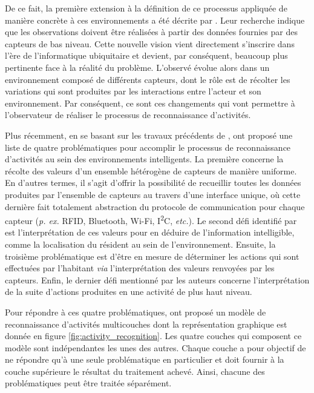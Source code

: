 {{De ce fait, la première extension à la définition de ce processus appliquée de manière concrète à ces environnements a été décrite par \cite{Patterson2005}. Leur recherche indique que les observations doivent être réalisées à partir des données fournies par des capteurs de bas niveau. Cette nouvelle vision vient directement s'inscrire dans l'ère de l'informatique ubiquitaire \citep{Weiser1991} et devient, par conséquent, beaucoup plus pertinente face à la réalité du problème. L'observé évolue alors dans un environnement composé de différents capteurs, dont le rôle est de récolter les variations qui sont produites par les interactions entre l'acteur et son environnement. Par conséquent, ce sont ces changements qui vont permettre à l'observateur de réaliser le processus de reconnaissance d'activités.

Plus récemment, en se basant sur les travaux précédents de \cite{Patterson2005}, \cite{Roy2013} ont proposé une liste de quatre problématiques pour accomplir le processus de reconnaissance d'activités au sein des environnements intelligents. La première concerne la récolte des valeurs d'un ensemble hétérogène de capteurs de manière uniforme. En d'autres termes, il s'agit d'offrir la possibilité de recueillir toutes les données produites par l'ensemble de capteurs au travers d'une interface unique, où cette dernière fait totalement abstraction du protocole de communication pour chaque capteur (\textit{p. ex.} RFID, Bluetooth, Wi-Fi, I\textsuperscript{2}C, \textit{etc.}). Le second défi identifié par \cite{Roy2013} est l'interprétation de ces valeurs pour en déduire de l'information intelligible, comme la localisation du résident au sein de l'environnement. Ensuite, la troisième problématique est d'être en mesure de déterminer les actions qui sont effectuées par l'habitant \textit{via} l'interprétation des valeurs renvoyées par les capteurs. Enfin, le dernier défi mentionné par les auteurs concerne l'interprétation de la suite d'actions produites en une activité de plus haut niveau.

Pour répondre à ces quatre problématiques, \cite{Roy2013} ont proposé un modèle de reconnaissance d'activités multicouches dont la représentation graphique est donnée en figure \ref{fig:activity_recognition}. Les quatre couches qui composent ce modèle sont indépendantes les unes des autres. Chaque couche a pour objectif de ne répondre qu'à une seule problématique en particulier et doit fournir à la couche supérieure le résultat du traitement achevé. Ainsi, chacune des problématiques peut être traitée séparément.

}}
